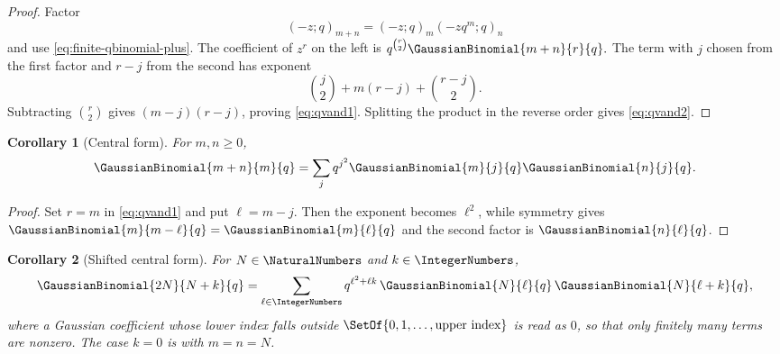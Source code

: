 \documentclass[11pt,a4paper,oneside,openany]{book}
\newtheorem{corollary}[corollary]{Corollary}
\theoremstyle{definition}
\theoremstyle{remark}
\begin{document}
\begin{proof}
Factor
\[
 (-z;q)_{m+n}=(-z;q)_m(-zq^m;q)_n
\]
and use \eqref{eq:finite-qbinomial-plus}.  The coefficient of $z^r$ on the left is
\(
 q^{\binom r2}\GaussianBinomial{m+n}{r}{q}.
\)
The term with $j$ chosen from the first factor and $r-j$ from the second has exponent
\[
 \binom j2+m(r-j)+\binom{r-j}{2}.
\]
Subtracting $\binom r2$ gives $(m-j)(r-j)$, proving \eqref{eq:qvand1}.  Splitting the product in the reverse order gives \eqref{eq:qvand2}.
\end{proof}

\begin{corollary}[Central form]\label{cor:central-vandermonde}
For $m,n\ge0$,
\[
 \GaussianBinomial{m+n}{m}{q}
 =\sum_j q^{j^2}\GaussianBinomial{m}{j}{q}\GaussianBinomial{n}{j}{q}.
\]
\end{corollary}

\begin{proof}
Set $r=m$ in \eqref{eq:qvand1} and put $\ell=m-j$.  Then the exponent becomes $\ell^2$, while symmetry gives $\GaussianBinomial{m}{m-\ell}{q}=\GaussianBinomial{m}{\ell}{q}$ and the second factor is $\GaussianBinomial{n}{\ell}{q}$.
\end{proof}


\begin{corollary}[Shifted central form]\label{cor:shifted-central-vandermonde}
For $N\in\NaturalNumbers$ and $k\in\IntegerNumbers$,
\begin{equation}
 \GaussianBinomial{2N}{N+k}{q}
 =\sum_{\ell\in\IntegerNumbers}q^{\ell^2+\ell k}\,
 \GaussianBinomial{N}{\ell}{q}\,\GaussianBinomial{N}{\ell+k}{q},
 \label{eq:shifted-central-vandermonde}
\end{equation}
where a Gaussian coefficient whose lower index falls outside $\SetOf{0,1,\dots,\text{upper index}}$ is read as $0$, so that only finitely many terms are nonzero.  The case $k=0$ is  with $m=n=N$.
\end{corollary}
\end{document}
